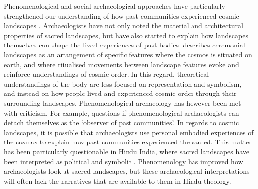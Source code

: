 	Phenomenological and social archaeological approaches have particularly strengthened our understanding of how past communities experienced cosmic landscapes \parencites{MeskellPreucel_2007}{Tilley_1994}. Archaeologists have not only noted the material and architectural properties of sacred landscapes, but have also started to explain how landscapes themselves can shape the lived experiences of past bodies.\textcite[199]{Ashmore_2010} describes ceremonial landscapes as an arrangement of specific features where the cosmos is situated on earth, and where ritualised movements between landscape features evoke and reinforce understandings of cosmic order. In this regard, theoretical understandings of the body are less focused on representation and symbolism, and instead on how people lived and experienced cosmic order through their surrounding landscapes. Phenomenological archaeology has however been met with criticism. For example,\textcite [271]{Fleming_2006} questions if phenomenological archaeologists can detach themselves as the ‘observer of past communities’. In regards to cosmic landscapes, it is possible that archaeologists use personal embodied experiences of the cosmos to explain how past communities experienced the sacred. This matter has been particularly questionable in Hindu India, where sacred landscapes have been interpreted as political and symbolic \parencites{Fritz_1986}{Mack_2004}{Sinopoli_2010}. Phenomenology has improved how archaeologists look at sacred landscapes, but these archaeological interpretations will often lack the narratives that are available to them in Hindu theology.

